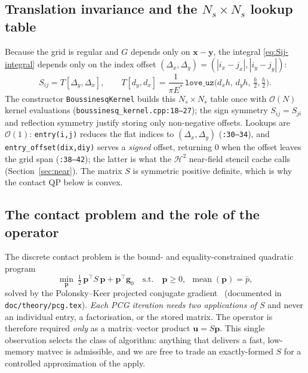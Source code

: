 \documentclass[11pt,a4paper]{article}
\newcommand{\Es}{E^{*}}
\newcommand{\Order}{\mathcal{O}}
\newcommand{\abs}[1]{\left\lvert #1 \right\rvert}
\newcommand{\xx}{\mathbf{x}}
\newcommand{\yy}{\mathbf{y}}
\newcommand{\pp}{\mathbf{p}}
\newcommand{\Htwo}{\mathcal{H}^2}
\newcommand{\code}[1]{\texttt{#1}}
\theoremstyle{definition}
\theoremstyle{remark}
\begin{document}
\subsection{Translation invariance and the $N_s\times N_s$ lookup table}
\label{sec:table}

Because the grid is regular and $G$ depends only on $\xx-\yy$, the integral
\eqref{eq:Sij-integral} depends only on the index offset
$(\Delta_x,\Delta_y)=(\abs{i_x-j_x},\abs{i_y-j_y})$:
\begin{equation}
  S_{ij} = T[\Delta_y,\Delta_x],
  \qquad
  T[d_y,d_x] = \frac{1}{\pi\Es}\,\code{love\_uz}\!\big(d_x h,\, d_y h,\, \tfrac{h}{2},\tfrac{h}{2}\big).
  \label{eq:table}
\end{equation}
The constructor \code{BoussinesqKernel} builds this $N_s\times N_s$ table once
with $\Order(N)$ kernel evaluations (\code{boussinesq\_kernel.cpp:18--27}); the
sign symmetry $S_{ij}=S_{ji}$ and reflection symmetry justify storing only
non-negative offsets. Lookups are $\Order(1)$: \code{entry(i,j)} reduces the flat
indices to $(\Delta_x,\Delta_y)$ (\code{:30--34}), and \code{entry\_offset(dix,diy)}
serves a \emph{signed} offset, returning $0$ when the offset leaves the grid span
(\code{:38--42}); the latter is what the $\Htwo$ near-field stencil cache calls
(Section~\ref{sec:near}). The matrix $S$ is symmetric positive definite, which is
why the contact QP below is convex.

\subsection{The contact problem and the role of the operator}

The discrete contact problem is the bound- and equality-constrained quadratic
program
\begin{equation}
  \min_{\pp}\ \tfrac12\,\pp^\top S\,\pp + \pp^\top \mathbf g_0
  \quad\text{s.t.}\quad \pp\ge 0,\ \ \operatorname{mean}(\pp)=\bar p,
  \label{eq:qp}
\end{equation}
solved by the Polonsky--Keer projected conjugate gradient~\cite{PolKeer1999}
(documented in \code{doc/theory/pcg.tex}). \emph{Each PCG iteration needs two
applications of $S$} and never an individual entry, a factorisation, or the
stored matrix. The operator is therefore required \emph{only} as a
matrix--vector product $\mathbf u = S\pp$. This single observation selects the
class of algorithm: anything that delivers a fast, low-memory matvec is
admissible, and we are free to trade an exactly-formed $S$ for a controlled
approximation of the apply.
\end{document}
